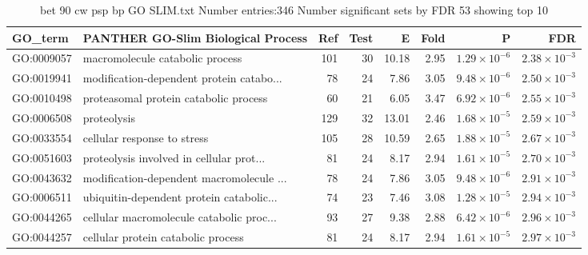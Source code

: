 \begin{table}[ht]
\centering
\begin{tabular}{llrrrrrr}
  \hline
GO\_term & PANTHER GO-Slim Biological Process & Ref & Test & E & Fold & P & FDR \\ 
  \hline
GO:0009057 & macromolecule catabolic process  & 101 & 30 & 10.18 & 2.95 & $1.29 \times 10^{-6}$ & $2.38 \times 10^{-3}$ \\ 
  GO:0019941 & modification-dependent protein catabo... & 78 & 24 & 7.86 & 3.05 & $9.48 \times 10^{-6}$ & $2.50 \times 10^{-3}$ \\ 
  GO:0010498 & proteasomal protein catabolic process  & 60 & 21 & 6.05 & 3.47 & $6.92 \times 10^{-6}$ & $2.55 \times 10^{-3}$ \\ 
  GO:0006508 & proteolysis  & 129 & 32 & 13.01 & 2.46 & $1.68 \times 10^{-5}$ & $2.59 \times 10^{-3}$ \\ 
  GO:0033554 & cellular response to stress  & 105 & 28 & 10.59 & 2.65 & $1.88 \times 10^{-5}$ & $2.67 \times 10^{-3}$ \\ 
  GO:0051603 & proteolysis involved in cellular prot... & 81 & 24 & 8.17 & 2.94 & $1.61 \times 10^{-5}$ & $2.70 \times 10^{-3}$ \\ 
  GO:0043632 & modification-dependent macromolecule ... & 78 & 24 & 7.86 & 3.05 & $9.48 \times 10^{-6}$ & $2.91 \times 10^{-3}$ \\ 
  GO:0006511 & ubiquitin-dependent protein catabolic... & 74 & 23 & 7.46 & 3.08 & $1.28 \times 10^{-5}$ & $2.94 \times 10^{-3}$ \\ 
  GO:0044265 & cellular macromolecule catabolic proc... & 93 & 27 & 9.38 & 2.88 & $6.42 \times 10^{-6}$ & $2.96 \times 10^{-3}$ \\ 
  GO:0044257 & cellular protein catabolic process  & 81 & 24 & 8.17 & 2.94 & $1.61 \times 10^{-5}$ & $2.97 \times 10^{-3}$ \\ 
  \hline
\end{tabular}
\caption{bet 90 cw psp bp GO SLIM.txt Number entries:346 Number significant sets by FDR 53 showing top 10} 
\label{tab:bet 90 cw psp bp GO SLIM.txt Number entries:346 Number significant sets by FDR 53 showing top 10}
\end{table}



